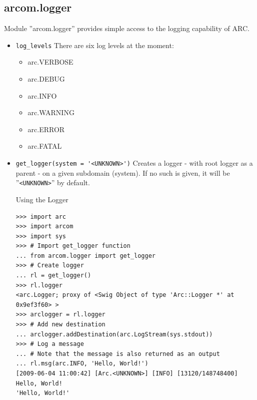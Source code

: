 \documentclass{article}
\begin{document}
\subsection{arcom.logger}
\label{alogger}
Module ''arcom.logger'' provides simple access to the logging capability of ARC.
\begin{flushleft}
\begin{itemize}
  \item{ \verb$log_levels$\newline
  There are six log levels at the moment:
    \begin{itemize}
      \item{arc.VERBOSE}
      \item{arc.DEBUG}
      \item{arc.INFO}
      \item{arc.WARNING}
      \item{arc.ERROR}
      \item{arc.FATAL}
    \end{itemize}
  }
\end{itemize}
\begin{itemize}
  \item{ \verb$get_logger(system = '<UNKNOWN>')$\newline
  Creates a logger - with root logger as a parent - on a given subdomain (system). 
  If no such is given, it will be ''\verb$<UNKNOWN>$'' by default.
    \begin{example}
      \caption{Using the Logger}\label{loggerex}
\begin{verbatim}
>>> import arc
>>> import arcom
>>> import sys
>>> # Import get_logger function
... from arcom.logger import get_logger
>>> # Create logger
... rl = get_logger()
>>> rl.logger
<arc.Logger; proxy of <Swig Object of type 'Arc::Logger *' at 0x9ef3f60> >
>>> arclogger = rl.logger
>>> # Add new destination
... arclogger.addDestination(arc.LogStream(sys.stdout))
>>> # Log a message
... # Note that the message is also returned as an output
... rl.msg(arc.INFO, 'Hello, World!')
[2009-06-04 11:00:42] [Arc.<UNKNOWN>] [INFO] [13120/148748400] Hello, World!
'Hello, World!'
\end{verbatim}
    \end{example}
  }
\end{itemize}
\end{flushleft}
\end{document}

